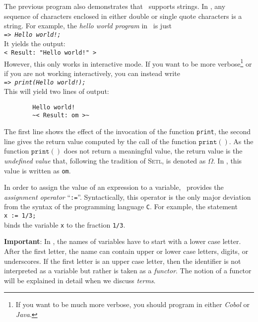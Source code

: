 \noindent
The previous program also demonstrates that \setlx\ supports strings.  In \setlx, any sequence of
characters enclosed in either double or single quote characters is a string.  For example, the 
\emph{hello world program} in \setlx\ is just 
\\[0.2cm]
\hspace*{1.3cm}
\texttt{=> \textsl{Hello world!;}}
\\[0.2cm]
It yields the output:
\\[0.2cm]
\hspace*{1.3cm}
\texttt{< Result: "Hello world!" >}
\texttt{}
\\[0.2cm]
However, this only works in interactive mode.  If you want to be more verbose\footnote{
If you want to be much more verbose, you should program in either \textsl{Cobol} or \textsl{Java}.
} or if you are not working interactively, you can instead write
\\[0.2cm]
\hspace*{1.3cm}
\texttt{=> \textsl{print(Hello world!);}}
\\[0.2cm]
This will yield two lines of  output:
\begin{verbatim}
        Hello world!
        ~< Result: om >~
\end{verbatim}
The first line shows the effect of the invocation of the function \texttt{print}, the
second line gives the return value computed by the call of the function $\texttt{print}()$.  As the
function $\texttt{print}()$ does not return a meaningful value, the
return value is the \emph{undefined value} that, following the
tradition of \textsc{Setl}, is denoted as $\Omega$.  In \setlx, this value is written as \texttt{om}.


In order to assign the value of an expression to a variable, \setlx\ provides the 
\emph{assignment operator} ``\texttt{:=}''.  Syntactically, this operator is the only major deviation from the syntax 
of the programming language \texttt{C}. For example, the statement
\\[0.2cm]
\hspace*{1.3cm}
\texttt{x := 1/3;}
\\[0.2cm]
binds the variable \texttt{x} to the fraction \texttt{1/3}.  
\vspace*{0.3cm}

\noindent
\textbf{Important}:  In \setlx, the names of variables
have to start with a lower case letter.  After the first letter, the name can contain
upper or lower case letters, digits, or underscores.  If the first letter is an upper case
letter, then the identifier is not interpreted as a variable but rather is taken as a
\emph{functor}.  The notion of a functor will be explained in detail when we discuss \emph{terms}.


